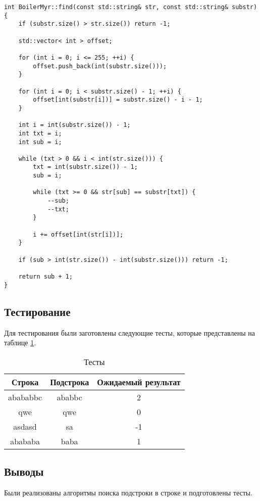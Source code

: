 \begin{lstlisting}[caption=Алгоритм Бойлера-Мура,label=lst:bm]
int BoilerMyr::find(const std::string& str, const std::string& substr)
{
    if (substr.size() > str.size()) return -1;

    std::vector< int > offset;

    for (int i = 0; i <= 255; ++i) {
        offset.push_back(int(substr.size()));
    }

    for (int i = 0; i < substr.size() - 1; ++i) {
        offset[int(substr[i])] = substr.size() - i - 1;
    }

    int i = int(substr.size()) - 1;
    int txt = i;
    int sub = i;

    while (txt > 0 && i < int(str.size())) {
        txt = int(substr.size()) - 1;
        sub = i;

        while (txt >= 0 && str[sub] == substr[txt]) {
            --sub;
            --txt;
        }

        i += offset[int(str[i])];
    }

    if (sub > int(str.size()) - int(substr.size())) return -1;

    return sub + 1;
}
\end{lstlisting}

\subsection{Тестирование}

Для тестирования были заготовлены следующие тесты, которые представлены
на таблице \ref{table:test}.

\begin{table}[H]
    \caption{Тесты}
    \label{table:test}
    \centering
    \begin{tabular}{|c|c||c|}
        \hline
        Строка & Подстрока & Ожидаемый результат \\
        \hline
        \hline
        abababbc & ababbc & 2 \\
        \hline
        qwe & qwe & 0 \\
        \hline
        asdasd & sa & -1 \\
        \hline
        abababa & baba & 1 \\
        \hline
    \end{tabular}
\end{table}

\subsection{Выводы}

Были реализованы алгоритмы поиска подстроки в строке и подготовлены тесты.
